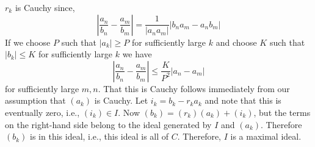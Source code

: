\documentclass[11pt]{article}
\begin{document}
\begin{enumerate}
$r_k$ is Cauchy since, 
\[|\frac{a_n}{b_n} - \frac{a_m}{b_m}| = \frac{1}{|a_na_m|}|b_na_m - a_nb_m| \]
If we choose $P$ such that $|a_k| \geq P$ for sufficiently large $k$ and choose $K$ such that $|b_k| \leq K$ for sufficiently large $k$ we have
\[|\frac{a_n}{b_n} - \frac{a_m}{b_m}| \leq \frac{K}{P^2}|a_n - a_m| \]
for sufficiently large $m,n$.  That this is Cauchy follows immediately from our assumption that $(a_k)$ is Cauchy.  Let $i_k = b_k - r_ka_k$ and note that this is eventually zero, i.e., $(i_k) \in I$.  Now $(b_k) = (r_k)(a_k) + (i_k)$, but the terms on the right-hand side belong to the ideal generated by $I$ and $(a_k)$.  Therefore $(b_k)$ is in this ideal, i.e., this ideal is all of $C$.  Therefore, $I$ is a maximal ideal.
\end{enumerate}
\end{document}
